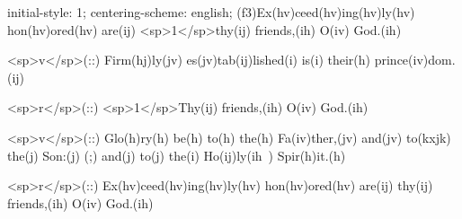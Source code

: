 initial-style: 1;
centering-scheme: english;
(f3)Ex(hv)ceed(hv)ing(hv)ly(hv) hon(hv)ored(hv) are(ij) <sp>1</sp>thy(ij) friends,(ih) O(iv) God.(ih)

<sp>v</sp>(::) Firm(hj)ly(jv) es(jv)tab(ij)lished(i) is(i) their(h) prince(iv)dom.(ij)

<sp>r</sp>(::) <sp>1</sp>Thy(ij) friends,(ih) O(iv) God.(ih)

<sp>v</sp>(::) Glo(h)ry(h) be(h) to(h) the(h) Fa(iv)ther,(jv) and(jv) to(kxjk) the(j) Son:(j) (;) and(j) to(j) the(i) Ho(ij)ly(ih~) Spir(h)it.(h)

<sp>r</sp>(::) Ex(hv)ceed(hv)ing(hv)ly(hv) hon(hv)ored(hv) are(ij) thy(ij) friends,(ih) O(iv) God.(ih)